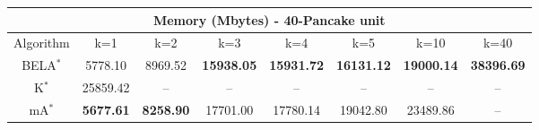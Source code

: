 \begin{tabular}{c|ccccccc}\toprule
\multicolumn{8}{c}{Memory (Mbytes) - 40-Pancake unit}\\ \midrule
Algorithm & k=1 & k=2 & k=3 & k=4 & k=5 & k=10 & k=40 \\ \midrule
BELA$^*$ & 5778.10 & 8969.52 & \textbf{15938.05} & \textbf{15931.72} & \textbf{16131.12} & \textbf{19000.14} & \textbf{38396.69} \\
K$^*$ & 25859.42 & -- & -- & -- & -- & -- & -- \\
mA$^*$ & \textbf{5677.61} & \textbf{8258.90} & 17701.00 & 17780.14 & 19042.80 & 23489.86 & -- \\ \bottomrule 
\end{tabular}
